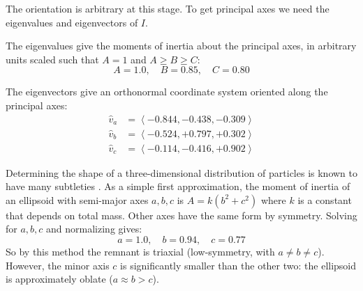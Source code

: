\documentclass[twocolumn]{aastex63}
\newcommand{\todo}{\color{red}{TODO}\color{black}\hspace{2mm}}
\begin{document}
The orientation is arbitrary at this stage. To get principal axes we need the eigenvalues and eigenvectors of $I$. 

The eigenvalues give the moments of inertia about the principal axes, in arbitrary units scaled such that $A=1$ and $A \ge B \ge C$:
\[ A=1.0,\quad B= 0.85,\quad C=0.80 \]

The eigenvectors give an orthonormal coordinate system oriented along the principal axes:
\begin{align*}
	\hat{v}_a &= \left< -0.844, -0.438, -0.309 \right> \\
	\hat{v}_b &= \left< -0.524, +0.797,  +0.302 \right> \\
	\hat{v}_c &= \left< -0.114, -0.416 , +0.902 \right>
\end{align*}

Determining the shape of a three-dimensional distribution of particles is known to have many subtleties \citep{maccio_concentration_2007, jing_triaxial_2002}. As a simple first approximation, the moment of inertia of an ellipsoid with semi-major axes $a, b, c$ is $A = k(b^2 + c^2)$ where $k$ is a constant that depends on total mass. Other axes have the same form by symmetry. Solving for $a, b, c$ and normalizing gives:
\[ a = 1.0,\quad b = 0.94,\quad c = 0.77 \]
So by this method the remnant is triaxial (low-symmetry, with $a \ne b \ne c$). However, the minor axis $c$ is significantly smaller than the other two: the ellipsoid is approximately oblate ($a \approx b > c$).

%
%
\end{document}
